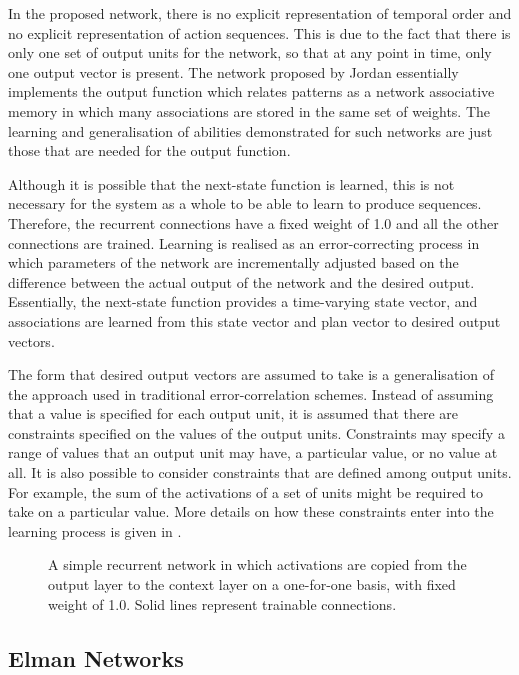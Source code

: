 In the proposed network, there is no explicit representation of temporal order and no explicit representation of action sequences. This is due to the fact that there is only one set of output units for the network, so that at any point in time, only one output vector is present. The network proposed by Jordan essentially implements the output function which relates patterns as a network associative memory in which many associations are stored in the same set of weights. The learning and generalisation of abilities demonstrated for such networks \cite{rumelhart1986parallel, rumelhart1981parallel} are just those that are needed for the output function.

Although it is possible that the next-state function is learned, this is not necessary for the system as a whole to be able to learn to produce sequences. Therefore, the recurrent connections have a fixed weight of 1.0 and all the other connections are trained. Learning is realised as an error-correcting process in which parameters of the network are incrementally adjusted based on the difference between the actual output of the network and the desired output. Essentially, the next-state function provides a time-varying state vector, and associations are learned from this state vector and plan vector to desired output vectors. 

The form that desired output vectors are assumed to take is a generalisation of the approach used in traditional error-correlation schemes. Instead of assuming that a value is specified for each output unit, it is assumed that there are constraints specified on the values of the output units. Constraints may specify a range of values that an output unit may have, a particular value, or no value at all. It is also possible to consider constraints that are defined among output units. For example, the sum of the activations of a set of units might be required to take on a particular value. More details on how these constraints enter into the learning process is given in \cite{jordan1997serial}.

\begin{figure}
\centering
\scalebox{1.0}{\jordangeneral}
\caption{\label{fig:jordan}A simple recurrent network in which activations are copied from the output layer to the context layer on a one-for-one basis, with fixed weight of 1.0. Solid lines represent trainable connections.}
\end{figure}

\subsection{Elman Networks}
\label{sec:preliminaries:nn:elman}


